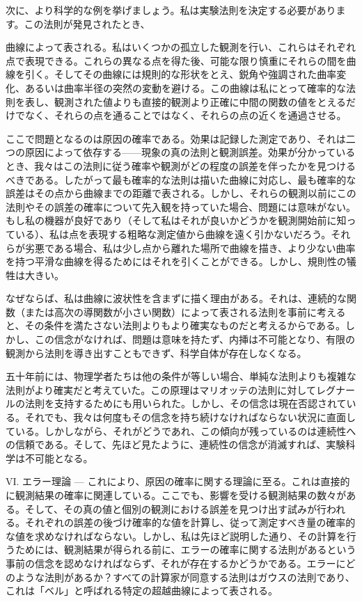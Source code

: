\documentclass[a4paper,11pt,openany]{ltjsbook}
\begin{document}
次に、より科学的な例を挙げましょう。私は実験法則を決定する必要があります。この法則が発見されたとき、


曲線によって表される。私はいくつかの孤立した観測を行い、これらはそれぞれ点で表現できる。これらの異なる点を得た後、可能な限り慎重にそれらの間を曲線を引く。そしてその曲線には規則的な形状をとえ、鋭角や強調された曲率変化、あるいは曲率半径の突然の変動を避ける。この曲線は私にとって確率的な法則を表し、観測された値よりも直接的観測より正確に中間の関数の値をとえるだけでなく、それらの点を通ることではなく、それらの点の近くを通過させる。

ここで問題となるのは原因の確率である。効果は記録した測定であり、それは二つの原因によって依存する——現象の真の法則と観測誤差。効果が分かっているとき、我々はこの法則に従う確率や観測がどの程度の誤差を伴ったかを見つけるべきである。したがって最も確率的な法則は描いた曲線に対応し、最も確率的な誤差はその点から曲線までの距離で表される。しかし、それらの観測以前にこの法則やその誤差の確率について先入観を持っていた場合、問題には意味がない。もし私の機器が良好であり（そして私はそれが良いかどうかを観測開始前に知っている）、私は点を表現する粗略な測定値から曲線を遠く引かないだろう。それらが劣悪である場合、私は少し点から離れた場所で曲線を描き、より少ない曲率を持つ平滑な曲線を得るためにはそれを引くことができる。しかし、規則性の犠牲は大きい。

なぜならば、私は曲線に波状性を含まずに描く理由がある。それは、連続的な関数（または高次の導関数が小さい関数）によって表される法則を事前に考えると、その条件を満たさない法則よりもより確実なものだと考えるからである。しかし、この信念がなければ、問題は意味を持たず、内挿は不可能となり、有限の観測から法則を導き出すこともできず、科学自体が存在しなくなる。

五十年前には、物理学者たちは他の条件が等しい場合、単純な法則よりも複雑な法則がより確実だと考えていた。この原理はマリオッテの法則に対してレグナールの法則を支持するためにも用いられた。しかし、その信念は現在否認されている。それでも、我々は何度もその信念を持ち続けなければならない状況に直面している。しかしながら、それがどうであれ、この傾向が残っているのは連続性への信頼である。そして、先ほど見たように、連続性の信念が消滅すれば、実験科学は不可能となる。

VI. エラー理論 — これにより、原因の確率に関する理論に至る。これは直接的に観測結果の確率に関連している。ここでも、影響を受ける観測結果の数々がある。そして、その真の値と個別の観測における誤差を見つけ出す試みが行われる。それぞれの誤差の後づけ確率的な値を計算し、従って測定すべき量の確率的な値を求めなければならない。しかし、私は先ほど説明した通り、その計算を行うためには、観測結果が得られる前に、エラーの確率に関する法則があるという事前の信念を認めなければならず、それが存在するかどうかである。エラーにどのような法則があるか？すべての計算家が同意する法則はガウスの法則であり、これは「ベル」と呼ばれる特定の超越曲線によって表される。
\end{document}
